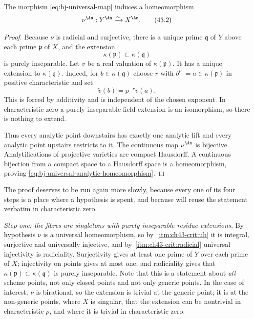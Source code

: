 \begin{lemma}\label{lem:bj-universal-analytic-homeomorphism}
The morphism \eqref{eq:bj-universal-map} induces a homeomorphism
\[
                         \nu^{\An}:Y^{\An}\xrightarrow{\sim}X^{\An}.
\tag{43.2}\label{eq:bj-universal-analytic-homeomorphism}
\]
\end{lemma}

\begin{proof}
Because $\nu$ is radicial and surjective, there is a unique prime
$\mathfrak q$ of $Y$ above each prime $\mathfrak p$ of $X$, and the
extension
\[
                     \kappa(\mathfrak p)\subset\kappa(\mathfrak q)
\]
is purely inseparable.
Let $v$ be a real valuation of $\kappa(\mathfrak p)$.
It has a unique extension to $\kappa(\mathfrak q)$.
Indeed, for $b\in\kappa(\mathfrak q)$ choose $r$ with
$b^{p^r}=a\in\kappa(\mathfrak p)$ in positive characteristic and set
\[
                         \widetilde v(b)=p^{-r}v(a).
\tag{43.3}\label{eq:bj-purely-inseparable-valuation}
\]
This is forced by additivity and is independent of the chosen exponent.
In characteristic zero a purely inseparable field extension is an
isomorphism, so there is nothing to extend.

Thus every analytic point downstairs has exactly one analytic lift and every
analytic point upstairs restricts to it.
The continuous map $\nu^{\An}$ is bijective.
Analytifications of projective varieties are compact Hausdorff.
A continuous bijection from a compact space to a Hausdorff space is a
homeomorphism, proving \eqref{eq:bj-universal-analytic-homeomorphism}.
\end{proof}

The proof deserves to be run again more slowly, because every one of its
four steps is a place where a hypothesis is spent, and because
 will reuse the statement verbatim
in characteristic zero.

\emph{Step one: the fibres are singletons with purely inseparable residue
extensions.}  By hypothesis $\nu$ is a universal homeomorphism, so by
\,\cref{itm:ch43-crit:uh} it is integral, surjective
and universally injective, and by
\,\cref{itm:ch43-crit:radicial} universal
injectivity is radiciality.  Surjectivity gives at least one prime of $Y$
over each prime of $X$; injectivity on points gives at most one; and
radiciality gives that $\kappa(\mathfrak p)\subset\kappa(\mathfrak q)$ is
purely inseparable.  Note that this is a statement about \emph{all} scheme
points, not only closed points and not only generic points.  In the case of
interest, $\nu$ is birational, so the extension is trivial at the generic
point; it is at the non-generic points, where $X$ is singular, that the
extension can be nontrivial in characteristic $p$, and where it is trivial
in characteristic zero.

